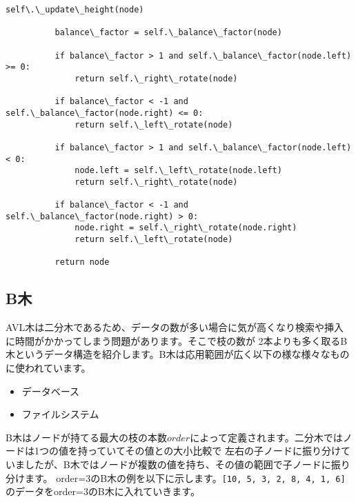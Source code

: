 \documentclass{jlreq}
\begin{document}
\begin{lstlisting}[caption=二分ヒープの実装, label=binaryheap, frame=TRBL, label={binaryheap}]
          self\.\_update\_height(node)
          
          balance\_factor = self.\_balance\_factor(node)
          
          if balance\_factor > 1 and self.\_balance\_factor(node.left) >= 0:
              return self.\_right\_rotate(node)
          
          if balance\_factor < -1 and self.\_balance\_factor(node.right) <= 0:
              return self.\_left\_rotate(node)
          
          if balance\_factor > 1 and self.\_balance\_factor(node.left) < 0:
              node.left = self.\_left\_rotate(node.left)
              return self.\_right\_rotate(node)
          
          if balance\_factor < -1 and self.\_balance\_factor(node.right) > 0:
              node.right = self.\_right\_rotate(node.right)
              return self.\_left\_rotate(node)
          
          return node
  \end{lstlisting}

\newpage
\subsection{B木}
AVL木は二分木であるため、データの数が多い場合に気が高くなり検索や挿入に時間がかかってしまう問題があります。そこで枝の数が
2本よりも多く取るB木というデータ構造を紹介します。B木は応用範囲が広く以下の様な様々なものに使われています。

\begin{itemize}
  \item データベース
  \item ファイルシステム
\end{itemize}

B木はノードが持てる最大の枝の本数$order$によって定義されます。二分木ではノードは1つの値を持っていてその値との大小比較で
左右の子ノードに振り分けていましたが、B木ではノードが複数の値を持ち、その値の範囲で子ノードに振り分けます。
order=$3$のB木の例を以下に示します。\texttt{[10, 5, 3, 2, 8, 4, 1, 6]}
のデータをorder=$3$のB木に入れていきます。

\vspace{0.5cm}

\begin{center}
\end{center}
\end{document}
